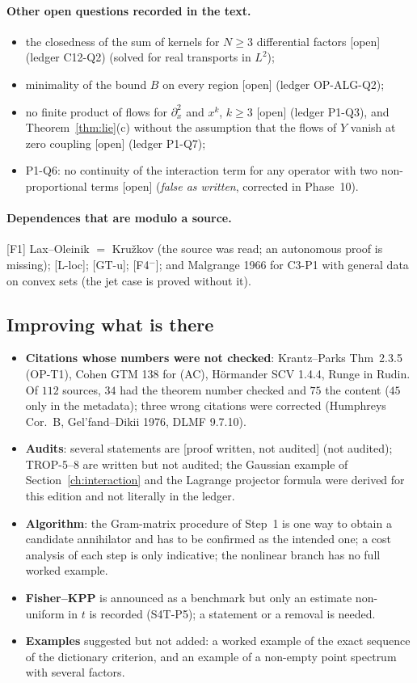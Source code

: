 \documentclass[11pt]{article}
\theoremstyle{plain}
\theoremstyle{definition}
\theoremstyle{remark}
\newcommand{\badge}[2]{\textcolor{#1}{\textsf{\footnotesize[#2]}}}
\newcommand{\openq}{\badge{cB}{open}}
\newcommand{\led}[1]{\textcolor{cG}{\textsf{\footnotesize(ledger #1)}}}
\newcommand{\pw}{\badge{cD}{proof written, not audited}}
\begin{document}
\paragraph{Other open questions recorded in the text.}
\begin{itemize}
\item the closedness of the sum of kernels for $N\ge3$ differential factors \openq{} \led{C12-Q2} (solved for real transports in $L^2$);
\item minimality of the bound $B$ on every region \openq{} \led{OP-ALG-Q2};
\item no finite product of flows for $\partial_x^2$ and $x^k$, $k\ge3$ \openq{} \led{P1-Q3}, and Theorem~\ref{thm:lie}(c) without the assumption that the flows of $Y$ vanish at zero coupling \openq{} \led{P1-Q7};
\item P1-Q6: no continuity of the interaction term for any operator with two non-proportional terms \openq{} (\emph{false as written}, corrected in Phase~10).
\end{itemize}

\paragraph{Dependences that are modulo a source.} [F1] Lax--Oleinik $=$ Kru\v zkov (the source was read; an autonomous proof is missing); [L-loc]; [GT-u]; [F4$^-$]; and Malgrange 1966 for C3-P1 with general data on convex sets (the jet case is proved without it).

\subsection{Improving what is there}

\begin{itemize}
\item \textbf{Citations whose numbers were not checked}: Krantz--Parks Thm~2.3.5 (OP-T1), Cohen GTM 138 for (AC), H\"ormander SCV 1.4.4, Runge in Rudin. Of $112$ sources, $34$ had the theorem number checked and $75$ the content ($45$ only in the metadata); three wrong citations were corrected (Humphreys Cor.~B, Gel'fand--Dikii 1976, DLMF 9.7.10).
\item \textbf{Audits}: several statements are \pw{} (not audited); TROP-5--8 are written but not audited; the Gaussian example of Section~\ref{ch:interaction} and the Lagrange projector formula were derived for this edition and not literally in the ledger.
\item \textbf{Algorithm}: the Gram-matrix procedure of Step~1 is one way to obtain a candidate annihilator and has to be confirmed as the intended one; a cost analysis of each step is only indicative; the nonlinear branch has no full worked example.
\item \textbf{Fisher--KPP} is announced as a benchmark but only an estimate non-uniform in $t$ is recorded (S4T-P5); a statement or a removal is needed.
\item \textbf{Examples} suggested but not added: a worked example of the exact sequence of the dictionary criterion, and an example of a non-empty point spectrum with several factors.
\end{itemize}
\end{document}

